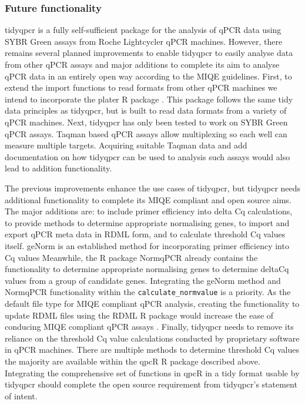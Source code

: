 \documentclass[../main.tex]{subfiles}
\begin{document}
\subsubsection{Future functionality}

tidyqpcr is a fully self-sufficient package for the analysis of qPCR data using SYBR Green assays from Roche Lightcycler qPCR machines. 
However, there remains several planned improvements to enable tidyqpcr to easily analyse data from other qPCR assays and major additions to complete its aim to analyse qPCR data in an entirely open way according to the MIQE guidelines.
First, to extend the import functions to read formats from other qPCR machines we intend to incorporate the plater R package \parencite{Hughes2016}.
This package follows the same tidy data principles as tidyqpcr, but is built to read data formats from a variety of qPCR machines.
Next, tidyqpcr has only been tested to work on SYBR Green qPCR assays.
Taqman based qPCR assays allow multiplexing so each well can measure multiple targets. 
Acquiring suitable Taqman data and add documentation on how tidyqpcr can be used to analysis such assays would also lead to addition functionality. 

The previous improvements enhance the use cases of tidyqpcr, but tidyqpcr needs additional functionality to complete its MIQE compliant and open source aims.
The major additions are: to include primer efficiency into delta Cq calculations, to provide methods to determine appropriate normalising genes, to import and export qPCR meta data in RDML form, and to calculate threshold Cq values itself. 
geNorm is an established method for incorporating primer efficiency into Cq values 
Meanwhile, the R package NormqPCR already contains the functionality to determine appropriate normalising genes to determine deltaCq values from a group of candidate genes. 
Integrating the geNorm method and NormqPCR functionality within the \lstinline{calculate_normvalue} is a priority.
As the default file type for MIQE compliant qPCR analysis, creating the functionality to update RDML files using the RDML R package would increase the ease of conducing MIQE compliant qPCR assays \parencite{Roediger2017}.
Finally, tidyqpcr needs to remove its reliance on the threshold Cq value calculations conducted by proprietary software in qPCR machines. 
There are multiple methods to determine threshold Cq values the majority are available within the qpcR R package described above.
Integrating the comprehensive set of functions in qpcR in a tidy format usable by tidyqpcr should complete the open source requirement from tidyqpcr's statement of intent. 
\end{document}
